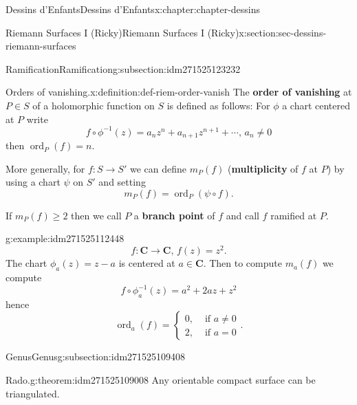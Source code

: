 \documentclass[oneside,10pt,]{book}
\newcommand{\terminology}[1]{\textbf{#1}}
\numberwithin{equation}{section}
\newcommand{\inv}{^{-1}}
\newcommand{\CC}{\mathbf{C}}
\DeclareMathOperator{\ord}{ord}
\newcommand{\amp}{&}
\begin{document}
\begin{chapterptx}{Dessins d'Enfants}{}{Dessins d'Enfants}{}{}{x:chapter:chapter-dessins}
\begin{sectionptx}{Riemann Surfaces I (Ricky)}{}{Riemann Surfaces I (Ricky)}{}{}{x:section:sec-dessins-riemann-surfaces}
\typeout{************************************************}
%
\begin{subsectionptx}{Ramification}{}{Ramification}{}{}{g:subsection:idm271525123232}
\begin{definition}{Orders of vanishing.}{x:definition:def-riem-order-vanish}%
The \terminology{order of vanishing} at \(P\in S\) of a holomorphic function on \(S\) is defined as follows: For \(\phi\) a  chart centered at \(P\) write%
\begin{equation*}
f\circ \phi\inv (z) = a_n z^n + a_{n+1}z^{n+1} + \cdots,\,a_n\ne 0
\end{equation*}
then \(\ord_P(f) = n\).%
\par
More generally, for \(f\colon S \to S'\) we can define \(m_P(f)\) (\terminology{multiplicity} of \(f\) at \(P\)) by using a chart \(\psi\) on \(S'\) and setting%
\begin{equation*}
m_P(f) = \ord_P(\psi\circ f)\text{.}
\end{equation*}
%
\par
If \(m_P(f)\ge 2\) then we call \(P\) a \terminology{branch point} of \(f\) and call \(f\) ramified at \(P\).%
\end{definition}
\begin{example}{}{g:example:idm271525112448}%
%
\begin{equation*}
f\colon \CC \to \CC,\,f(z) = z^2\text{.}
\end{equation*}
The chart \(\phi_a(z) = z-a\) is centered at \(a \in \CC\). Then to compute \(m_a(f)\) we compute%
\begin{equation*}
f\circ \phi\inv_a(z) = a^2 + 2az + z^2
\end{equation*}
hence%
\begin{equation*}
\ord_a(f) =\begin{cases} 0,\amp \text{ if } a\ne 0\\ 2,\amp\text{ if } a= 0\end{cases}\text{.}
\end{equation*}
%
\end{example}
\end{subsectionptx}
%
%
\typeout{************************************************}
\typeout{************************************************}
%
\begin{subsectionptx}{Genus}{}{Genus}{}{}{g:subsection:idm271525109408}
\begin{theorem}{Rado.}{}{g:theorem:idm271525109008}%
Any orientable compact surface can be triangulated.%

\end{theorem}
\end{subsectionptx}
\end{sectionptx}
\end{chapterptx}
\end{document}
